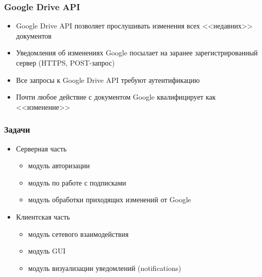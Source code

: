 \documentclass[10pt,pdf,hyperref={unicode}]{beamer}
\begin{document}
    \begin{frame}\frametitle{Google Drive API}
        \begin{itemize}%
            \pause
            \item	Google Drive API позволяет прослушивать изменения всех <<недавних>> документов
            \pause
            \item   Уведомления об изменениях Google посылает на заранее зарегистрированный сервер (HTTPS, POST-запрос)
            \pause
            \item   Все запросы к Google Drive API требуют аутентификацию
            \pause          
            \item   Почти любое действие с документом Google квалифицирует как <<изменение>>
        \end{itemize}
    \end{frame}    

	\begin{frame}\frametitle{Задачи}
        \begin{itemize}%
        	\item Серверная часть
	        \begin{itemize}
                \item модуль авторизации
                \item модуль по работе с подписками
                \item модуль обработки приходящих изменений от Google
            \end{itemize}            
            \pause
        	\item Клиентская часть
	        \begin{itemize}
                \item модуль сетевого взаимодействия
                \item модуль GUI
                \item модуль визуализации уведомлений (notifications)
            \end{itemize}                        
        \end{itemize}
    \end{frame}
    
\end{document}
